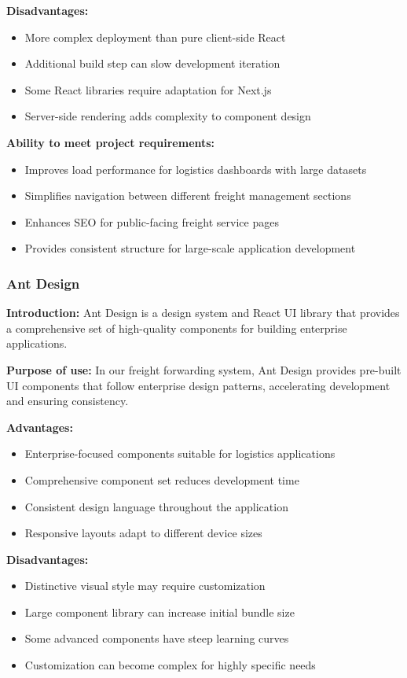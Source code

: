 \textbf{Disadvantages:}
\begin{itemize}
    \item More complex deployment than pure client-side React
    \item Additional build step can slow development iteration
    \item Some React libraries require adaptation for Next.js
    \item Server-side rendering adds complexity to component design
\end{itemize}

\textbf{Ability to meet project requirements:}
\begin{itemize}
    \item Improves load performance for logistics dashboards with large datasets
    \item Simplifies navigation between different freight management sections
    \item Enhances SEO for public-facing freight service pages
    \item Provides consistent structure for large-scale application development
\end{itemize}

\subsubsection{Ant Design}
\textbf{Introduction:} Ant Design \cite{ant-design} is a design system and React UI library that provides a comprehensive set of high-quality components for building enterprise applications.

\textbf{Purpose of use:} In our freight forwarding system, Ant Design provides pre-built UI components that follow enterprise design patterns, accelerating development and ensuring consistency.

\textbf{Advantages:}
\begin{itemize}
    \item Enterprise-focused components suitable for logistics applications
    \item Comprehensive component set reduces development time
    \item Consistent design language throughout the application
    \item Responsive layouts adapt to different device sizes
\end{itemize}

\textbf{Disadvantages:}
\begin{itemize}
    \item Distinctive visual style may require customization
    \item Large component library can increase initial bundle size
    \item Some advanced components have steep learning curves
    \item Customization can become complex for highly specific needs
\end{itemize}

